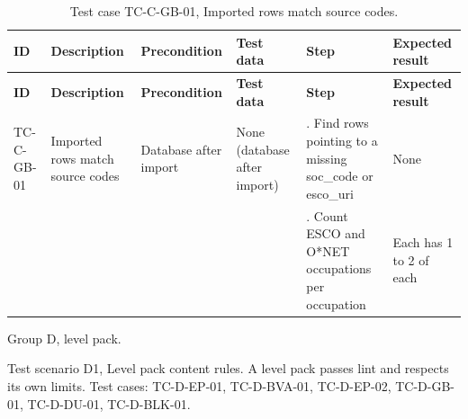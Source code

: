 {\footnotesize{}\renewcommand{\arraystretch}{1.1}
\begin{longtable}{|>{\raggedright\arraybackslash}p{}|>{\raggedright\arraybackslash}p{}|>{\raggedright\arraybackslash}p{}|>{\raggedright\arraybackslash}p{}|>{\raggedright\arraybackslash}p{}|>{\raggedright\arraybackslash}p{}|}
\caption{Test case TC-C-GB-01, Imported rows match source codes.} \\
\hline
\textbf{ID} & \textbf{Description} & \textbf{Precondition} & \textbf{Test data} & \textbf{Step} & \textbf{Expected result} \\ \hline
\endfirsthead
\hline
\textbf{ID} & \textbf{Description} & \textbf{Precondition} & \textbf{Test data} & \textbf{Step} & \textbf{Expected result} \\ \hline
\endhead
TC-C-GB-01 & Imported rows match source codes & Database after import & None (database after import) & 1. Find rows pointing to a missing soc\_code or esco\_uri & None \\ \cline{5-6}
 &  &  &  & 2. Count ESCO and O*NET occupations per occupation & Each has 1 to 2 of each \\ \hline
\end{longtable}
}

Group D, level pack.

Test scenario D1, Level pack content rules. A level pack passes lint and respects its own limits. Test cases: TC-D-EP-01, TC-\allowbreak{}D-\allowbreak{}BVA-\allowbreak{}01, TC-D-EP-02, TC-D-GB-01, TC-D-DU-01, TC-\allowbreak{}D-\allowbreak{}BLK-\allowbreak{}01.

